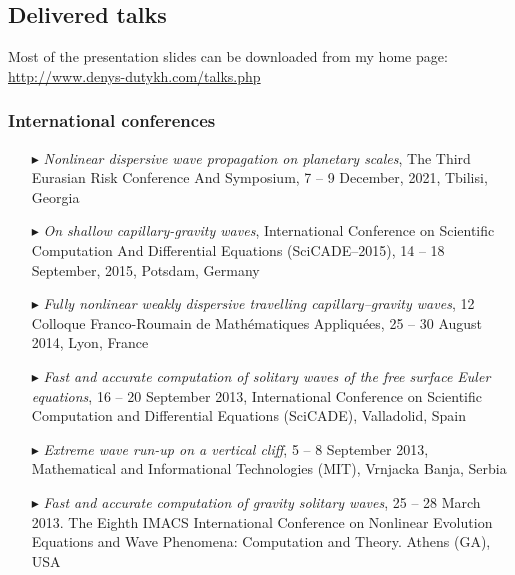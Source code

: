 \separator
\subsection{Delivered talks}

Most of the presentation slides can be downloaded from my home page: \\
\url{http://www.denys-dutykh.com/talks.php}

\vspace*{5mm}
\separator
\subsubsection{International conferences}

\begin{itemize}

  \item[$\blacktriangleright$] \textit{Nonlinear dispersive wave propagation on planetary scales}, The Third Eurasian Risk Conference And Symposium, 7 -- 9 December, 2021, Tbilisi, Georgia

  \item[$\blacktriangleright$] \textit{On shallow capillary-gravity waves}, International Conference on Scientific Computation And Differential Equations (SciCADE--2015), 14 -- 18 September, 2015, Potsdam, Germany

  \item[$\blacktriangleright$] \textit{Fully nonlinear weakly dispersive travelling capillary--gravity waves},  12 Colloque Franco-Roumain de Math\'ematiques Appliqu\'ees, 25 -- 30 August 2014, Lyon, France

  \item[$\blacktriangleright$] \textit{Fast and accurate computation of solitary waves of the free surface Euler equations}, 16 -- 20 September 2013, International Conference on Scientific Computation and Differential Equations (SciCADE), Valladolid, Spain

  \item[$\blacktriangleright$] \textit{Extreme wave run-up on a vertical cliff}, 5 -- 8 September 2013, Mathematical and Informational Technologies (MIT), Vrnjacka Banja, Serbia

  \item[$\blacktriangleright$] \textit{Fast and accurate computation of gravity solitary waves}, 25 -- 28 March 2013. The Eighth IMACS International Conference on Nonlinear Evolution Equations and Wave Phenomena: Computation and Theory. Athens (GA), USA


\end{itemize}
